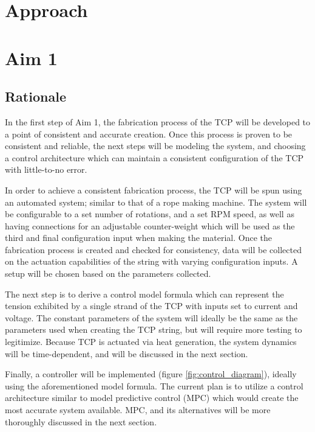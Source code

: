 \section*{Approach}

\section{Aim 1}

\subsection{Rationale}

In the first step of Aim 1, the fabrication process of the TCP will be developed to a point of consistent and accurate creation. Once this process is proven to be consistent and reliable, the next steps will be modeling the system, and choosing a control architecture which can maintain a consistent configuration of the TCP with little-to-no error.

In order to achieve a consistent fabrication process, the TCP will be spun using an automated system; similar to that of a rope making machine. The system will be configurable to a set number of rotations, and a set RPM speed, as well as having connections for an adjustable counter-weight which will be used as the third and final configuration input when making the material. Once the fabrication process is created and checked for consistency, data will be collected on the actuation capabilities of the string with varying configuration inputs. A setup will be chosen based on the parameters collected.

The next step is to derive a control model formula which can represent the tension exhibited by a single strand of the TCP with inputs set to current and voltage. The constant parameters of the system will ideally be the same as the parameters used when creating the TCP string, but will require more testing to legitimize. Because TCP is actuated via heat generation, the system dynamics will be time-dependent, and will be discussed in the next section.

Finally, a controller will be implemented (figure \ref{fig:control_diagram}), ideally using the aforementioned model formula. The current plan is to utilize a control architecture similar to model predictive control (MPC) which would create the most accurate system available. MPC, and its alternatives will be more thoroughly discussed in the next section.

